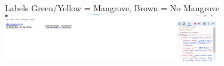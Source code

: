 




\begin{frame}{Labels}
    Green/Yellow = Mangrove, Brown = No Mangrove
    \centering
    \includegraphics[height=0.7\textheight,width=0.7\textwidth,keepaspectratio]{images/label.png}
\end{frame}

